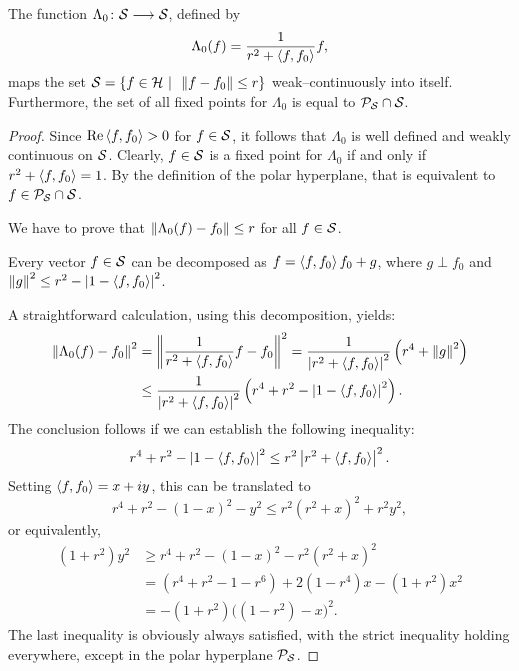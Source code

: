 \begin{lem} \label{l:SCALE}
The function $\Lambda_0\colon {\cal S} \longrightarrow {\cal S}$, defined by
\[ \Lambda_0(f) = \frac{1}{r^2+\left<f,f_0\right>} f, \]
maps the set ${\cal S} = \left\{f\in{\cal H}\,\,|\,\,\, \left\Vert f-f_0\right\Vert\leq r\right\}$
weak--continuously into itself. Furthermore, the set of all fixed points for
$\Lambda_0$ is equal to ${\cal P}_{{\cal S}} \cap {\cal S}$.
\end{lem}

\begin{proof}
Since $\operatorname{Re}\left<f,f_0\right>>0$ for $f\in{\cal S}$, it follows that $\Lambda_0$ is well
defined and weakly continuous on ${\cal S}$. Clearly, $f\in{\cal S}$ is a fixed point for
$\Lambda_0$ if and only if $r^2 + \left<f,f_0\right>=1$. By the definition of the
polar hyperplane, that is equivalent to $f\in{\cal P}_{{\cal S}}\cap{\cal S}$.

We have to prove that $\left\Vert\Lambda_0(f)-f_0\right\Vert\leq r$ for all $f\in{\cal S}$.

Every vector $f\in{\cal S}$ can be decomposed as $f=\left<f,f_0\right>f_0+g$, where $g
\perp f_0$ and $\left\Vert g\right\Vert^2\leq r^2 - \left\vert1-\left<f,f_0\right>\right\vert^2$.

A straightforward calculation, using this decomposition, yields:
\begin{equation*}
  \begin{split}
    \left\Vert\Lambda_0(f)-f_0\right\Vert^2
    &= \left\Vert\frac{1}{r^2+\left<f,f_0\right>} f - f_0\right\Vert^2
        = \frac{1}{\left\vert r^2+\left<f,f_0\right>\right\vert^2} \left(r^4+\left\Vert g\right\Vert^2\right)\\
    &\leq \frac{1}{\left\vert r^2+\left<f,f_0\right>\right\vert^2}
          \left(r^4+r^2-\left\vert1-\left<f,f_0\right>\right\vert^2\right).
  \end{split}
\end{equation*}
The conclusion follows if we can establish the following inequality:
\[ r^4+r^2 - \left\vert1-\left<f,f_0\right>\right\vert^2 \leq r^2\left\vert r^2+\left<f,f_0\right>\right\vert^2. \]
Setting $\left<f,f_0\right>=x+i{}y$, this can be translated to
\[ r^4+r^2 - (1-x)^2 - y^2 \leq r^2(r^2 + x)^2 + r^2y^2, \]
or equivalently,
\begin{equation*}
  \begin{split}
   (1+r^2)y^2 &\geq r^4+r^2 - (1-x)^2 - r^2(r^2 + x)^2\\
              & =  (r^4+r^2-1-r^6) + 2(1-r^4)x - (1+r^2)x^2  \\
              & = -(1+r^2)\big((1-r^2) - x\big)^2.
  \end{split}
\end{equation*}
The last inequality is obviously always satisfied, with the strict inequality
holding everywhere, except in the polar hyperplane ${\cal P}_{{\cal S}}$.
\end{proof}

